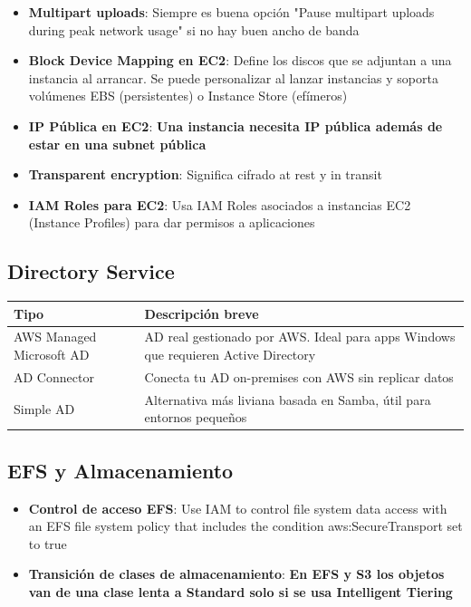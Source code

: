 \documentclass[12pt,a4paper]{report}
\newcommand{\important}[1]{\textcolor{dangerred}{\textbf{#1}}}
\begin{document}
\begin{itemize}
    \item \textbf{Multipart uploads}: Siempre es buena opción "Pause multipart uploads during peak network usage" si no hay buen ancho de banda
    \item \textbf{Block Device Mapping en EC2}: Define los discos que se adjuntan a una instancia al arrancar. Se puede personalizar al lanzar instancias y soporta volúmenes EBS (persistentes) o Instance Store (efímeros)
    \item \textbf{IP Pública en EC2}: \important{Una instancia necesita IP pública además de estar en una subnet pública}
    \item \textbf{Transparent encryption}: Significa cifrado at rest y in transit
    \item \textbf{IAM Roles para EC2}: Usa IAM Roles asociados a instancias EC2 (Instance Profiles) para dar permisos a aplicaciones
\end{itemize}

\subsection{Directory Service}

\begin{center}
\begin{longtable}{|p{4cm}|p{9cm}|}
\hline
\cellcolor{awsblue!20}\textbf{Tipo} & \cellcolor{awsblue!20}\textbf{Descripción breve} \\
\hline
\cellcolor{successgreen!20}AWS Managed Microsoft AD & AD real gestionado por AWS. Ideal para apps Windows que requieren Active Directory \\
\hline
AD Connector & Conecta tu AD on-premises con AWS sin replicar datos \\
\hline
Simple AD & Alternativa más liviana basada en Samba, útil para entornos pequeños \\
\hline
\end{longtable}
\end{center}

\subsection{EFS y Almacenamiento}

\begin{itemize}
    \item \textbf{Control de acceso EFS}: Use IAM to control file system data access with an EFS file system policy that includes the condition aws:SecureTransport set to true
    \item \textbf{Transición de clases de almacenamiento}: \important{En EFS y S3 los objetos van de una clase lenta a Standard solo si se usa Intelligent Tiering}
\end{itemize}
\end{document}
